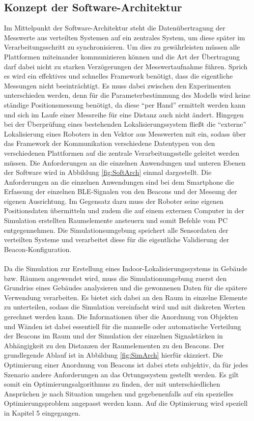 \subsection{Konzept der Software-Architektur}\label{sec:KonSofArch}
Im Mittelpunkt der Software-Architektur steht die Datenübertragung der Messwerte aus verteilten Systemen auf ein zentrales System, um diese später im Verarbeitungsschritt zu synchronisieren. Um dies zu gewährleisten müssen alle Plattformen miteinander kommunizieren können und die Art der Übertragung darf dabei nicht zu starken Verzögerungen der Messwertaufnahme führen. Sprich es wird ein effektives und schnelles Framework benötigt, dass die eigentliche Messungen nicht beeinträchtigt. Es muss dabei zwischen den Experimenten unterschieden werden, denn für die Parameterbestimmung des Modells wird keine ständige Positionsmessung benötigt, da diese "`per Hand"' ermittelt werden kann und sich im Laufe einer Messreihe für eine Distanz auch nicht ändert. Hingegen bei der Überprüfung eines bestehenden Lokalisierungssystem fließt die "`externe"' Lokalisierung eines Roboters in den Vektor aus Messwerten mit ein, sodass über das Framework der Kommunikation verschiedene Datentypen von den verschiedenen Plattformen auf die zentrale Verarbeitungsstelle geleitet werden müssen. Die Anforderungen an die einzelnen Anwendungen und unteren Ebenen der Software wird in Abbildung \ref{fig:SoftArch} einmal dargestellt. Die Anforderungen an die einzelnen Anwendungen sind bei dem Smartphone die Erfassung der einzelnen BLE-Signalen von den Beacons und der Messung der eigenen Ausrichtung. Im Gegensatz dazu muss der Roboter seine eigenen Positionsdaten übermitteln und zudem die auf einem externen Computer in der Simulation erstellten Raumelemente ansteuern und somit Befehle vom PC entgegennehmen. Die Simulationsumgebung speichert alle Sensordaten der verteilten Systeme und verarbeitet diese für die eigentliche Validierung der Beacon-Konfiguration. \\ \\
Da die Simulation zur Erstellung eines Indoor-Lokalisierungssystems in Gebäude bzw. Räumen angewendet wird, muss die Simulationumgebung zuerst den Grundriss eines Gebäudes analysieren und die gewonnenen Daten für die spätere Verwendung verarbeiten. Es bietet sich dabei an den Raum in einzelne Elemente zu unterteilen, sodass die Simulation vereinfacht wird und mit diskreten Werten gerechnet werden kann. Die Informationen über die Anordnung von Objekten und Wänden ist dabei essentiell für die manuelle oder automatische Verteilung der Beacons im Raum und der Simulation der einzelnen Signalstärken in Abhängigkeit zu den Distanzen der Raumelementen zu den Beacons. Der grundlegende Ablauf ist in Abbildung \ref{fig:SimArch} hierfür skizziert. Die Optimierung einer Anordnung von Beacons ist dabei stets subjektiv, da für jedes Szenario andere Anforderungen an das Ortungssystem gestellt werden. Es gilt somit ein Optimierungsalgorithmus zu finden, der mit unterschiedlichen Ansprüchen je nach Situation umgehen und gegebenenfalls auf ein spezielles Optimierungsproblem angepasst werden kann. Auf die Optimierung wird speziell in Kapitel 5 eingegangen.
